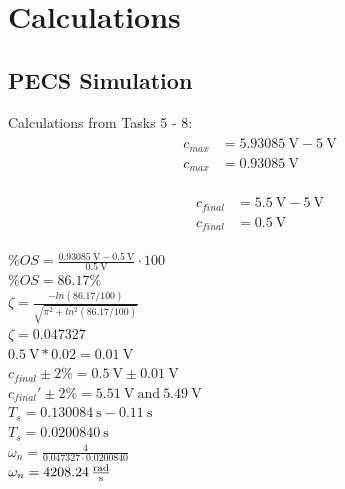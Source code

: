 \documentclass[a4paper,12pt]{article}
\begin{document}
\section{Calculations}
	\subsection{PECS Simulation}

Calculations from Tasks 5 - 8:
\begin{align}
\begin{split}\label{eq:1}
	c_{max} &={} \SI{5.93085}{\volt} - \SI{5}{\volt} \\
	c_{max} &={} \SI{0.93085}{\volt}
\end{split}
\end{align}

\begin{align}
\begin{split}\label{eq:2}
	c_{final} &= \SI{5.5}{\volt} - \SI{5}{\volt} \\
	c_{final} &= \SI{0.5}{\volt}
\end{split}	
\end{align} 

$\%OS = \frac{\SI{0.93085}{\volt}-\SI{0.5}{\volt}}{\SI{0.5}{\volt}} \cdot 100$\\

$\%OS =  86.17\%$\\

$\zeta = \frac{-ln(86.17/100)}{\sqrt{\pi^2+ln^2(86.17/100)}}$\\

$\zeta = 0.047327$\\

$\SI{0.5}{\volt}*0.02 = \SI{0.01}{\volt}$\\
 
$c_{final}\pm 2\% = \SI{0.5}{\volt} \pm\SI{0.01}{\volt}$\\
 
$c_{final}'\pm 2\% = \SI{5.51}{\volt} \:\textrm{and} \: \SI{5.49}{\volt}$\\
 
$T_s = \SI{0.130084}{\second} - \SI{0.11}{\second}$\\
 
$T_s = \SI{0.0200840}{\second}$\\

$\omega_n  = \frac{4}{0.047327 \cdot 0.0200840}$\\

$\omega_n  = \SI{4208.24}{\frac{\radian}{\second}} $
\end{document}

